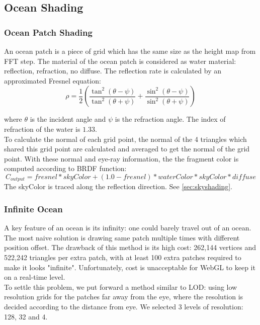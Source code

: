 \documentclass{jcgt}
\begin{document}
\subsection{Ocean Shading}
\subsubsection{Ocean Patch Shading}

An ocean patch is a piece of grid which has the same size as the height map from FFT step. The material of the ocean patch is considered as water material: reflection, refraction, no diffuse. The reflection rate is calculated by an approximated Fresnel equation:
\begin{equation}
\rho = \frac{1}{2} (\frac{\tan ^2 (\theta-\psi)}{\tan ^2 (\theta+\psi)} + \frac{\sin ^2 (\theta-\psi)}{\sin ^2 (\theta+\psi)} )
\end{equation}

where $\theta$ is the incident angle and $\psi$ is the refraction angle. The index of refraction of the water is $1.33$. \\

To calculate the normal of each grid point, the normal of the 4 triangles which shared this grid point are calculated and averaged to get the normal of the grid point.
With these normal and eye-ray information, the the fragment color is computed according to BRDF function:
\begin{equation}
 C_{output}=fresnel * skyColor + (1.0-fresnel) * waterColor*skyColor*diffuse
\end{equation}
The skyColor is traced along the reflection direction. See \ref{sec:skyshading}.

\subsubsection{Infinite Ocean}

A key feature of an ocean is its infinity: one could barely travel out of an ocean. The most naive solution is drawing same patch multiple times with different position offset. The drawback of this method is its high cost: 262,144 vertices and 522,242 triangles per extra patch, with at least 100 extra patches required to make it looks "infinite". Unfortunately, cost is unacceptable for WebGL to keep it on a real-time level. \\

To settle this problem, we put forward a method similar to LOD: using low resolution grids for the patches far away from the eye, where the resolution is decided according to the distance from eye. We selected 3 levels of resolution: 128, 32 and 4. \\
\end{document}
